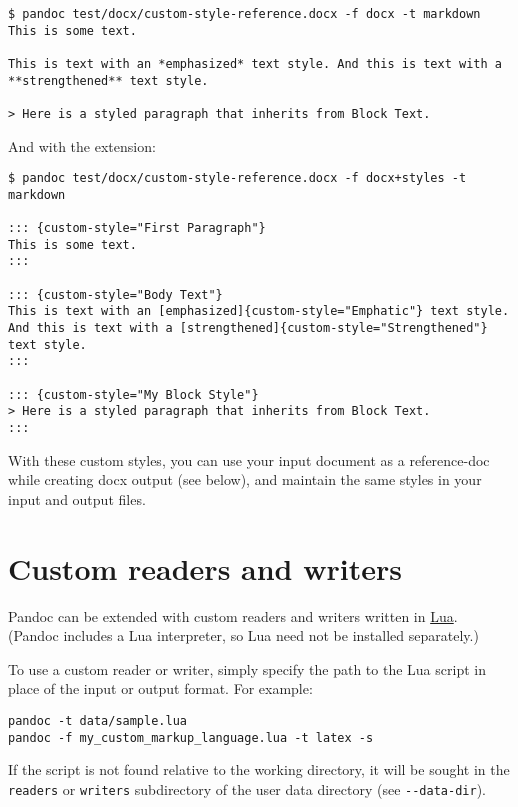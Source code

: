 \begin{verbatim}
$ pandoc test/docx/custom-style-reference.docx -f docx -t markdown
This is some text.

This is text with an *emphasized* text style. And this is text with a
**strengthened** text style.

> Here is a styled paragraph that inherits from Block Text.
\end{verbatim}

And with the extension:

\begin{verbatim}
$ pandoc test/docx/custom-style-reference.docx -f docx+styles -t markdown

::: {custom-style="First Paragraph"}
This is some text.
:::

::: {custom-style="Body Text"}
This is text with an [emphasized]{custom-style="Emphatic"} text style.
And this is text with a [strengthened]{custom-style="Strengthened"}
text style.
:::

::: {custom-style="My Block Style"}
> Here is a styled paragraph that inherits from Block Text.
:::
\end{verbatim}

With these custom styles, you can use your input document as a
reference-doc while creating docx output (see below), and maintain the
same styles in your input and output files.

\hypertarget{custom-readers-and-writers}{%
\section{Custom readers and writers}\label{custom-readers-and-writers}}

Pandoc can be extended with custom readers and writers written in
\href{https://www.lua.org}{Lua}. (Pandoc includes a Lua interpreter, so
Lua need not be installed separately.)

To use a custom reader or writer, simply specify the path to the Lua
script in place of the input or output format. For example:

\begin{verbatim}
pandoc -t data/sample.lua
pandoc -f my_custom_markup_language.lua -t latex -s
\end{verbatim}

If the script is not found relative to the working directory, it will be
sought in the \texttt{readers} or \texttt{writers} subdirectory of the
user data directory (see \texttt{-\/-data-dir}).

